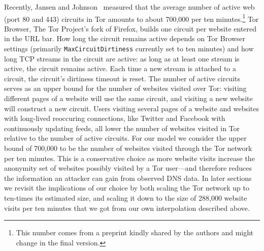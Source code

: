 Recently, Jansen and Johnson~\cite{Jansen2016a} measured that the average number
of active web (port 80 and 443) circuits in Tor amounts to about 700,000 per ten
minutes.\footnote{This number comes from a preprint kindly
shared by the authors and might change in the final version.}
Tor Browser, The Tor Project's fork of Firefox, builds one circuit per
website entered in the URL bar. How long the circuit remains active depends on
Tor Browser settings (primarily {\tt MaxCircuitDirtiness} currently set to ten
minutes) and how long TCP streams in the circuit are active: as long as at
least one stream is active, the circuit remains active.  Each time a new stream
is attached to a circuit, the circuit's dirtiness timeout is reset.
The number of active circuits serves as an
upper bound for the number of websites visited over Tor: visiting different
pages of a website will use the same circuit, and visiting a new website will
construct a new circuit.  Users visiting several pages of a website and websites
with long-lived reoccuring connections, like Twitter and Facebook with
continuously updating feeds,
all lower the number of websites visited in Tor relative to the number of active
circuits. 
For our model we consider the upper bound of 700,000 to be the number
of websites visited through the Tor network per ten minutes. This is a
conservative choice as more website visits increase the anonymity set of
websites possibly visited by a Tor user---and therefore reduces the
information an attacker can gain from observed DNS data. 
In later sections we revisit the implications of our choice by both
scaling the Tor network up to ten-times its estimated size, and scaling
it down to the size of 288,000 website visits per ten minutes that we
got from our own interpolation described above. 

